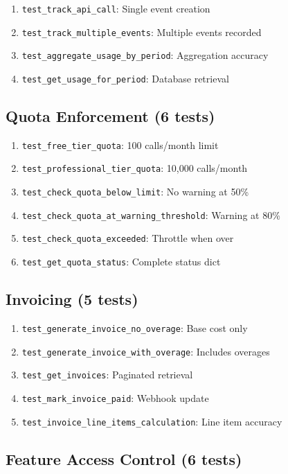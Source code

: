 \documentclass[12pt]{report}
\begin{document}
\begin{enumerate}
    \item \lstinline{test_track_api_call}: Single event creation
    \item \lstinline{test_track_multiple_events}: Multiple events recorded
    \item \lstinline{test_aggregate_usage_by_period}: Aggregation accuracy
    \item \lstinline{test_get_usage_for_period}: Database retrieval
\end{enumerate}

\subsection{Quota Enforcement (6 tests)}

\begin{enumerate}
    \item \lstinline{test_free_tier_quota}: 100 calls/month limit
    \item \lstinline{test_professional_tier_quota}: 10,000 calls/month
    \item \lstinline{test_check_quota_below_limit}: No warning at 50\%
    \item \lstinline{test_check_quota_at_warning_threshold}: Warning at 80\%
    \item \lstinline{test_check_quota_exceeded}: Throttle when over
    \item \lstinline{test_get_quota_status}: Complete status dict
\end{enumerate}

\subsection{Invoicing (5 tests)}

\begin{enumerate}
    \item \lstinline{test_generate_invoice_no_overage}: Base cost only
    \item \lstinline{test_generate_invoice_with_overage}: Includes overages
    \item \lstinline{test_get_invoices}: Paginated retrieval
    \item \lstinline{test_mark_invoice_paid}: Webhook update
    \item \lstinline{test_invoice_line_items_calculation}: Line item accuracy
\end{enumerate}

\subsection{Feature Access Control (6 tests)}
\end{document}
